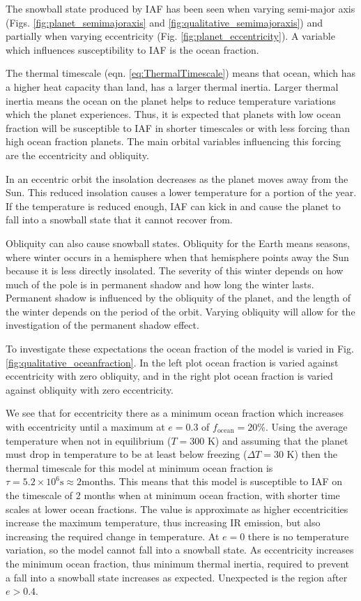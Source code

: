 \documentclass[12pt, onecolumn]{revtex4-2}    %
\begin{document}
The snowball state produced by IAF has been seen when varying semi-major axis (Figs. \ref{fig:planet_semimajoraxis} and \ref{fig:qualitative_semimajoraxis}) and partially when varying eccentricity (Fig. \ref{fig:planet_eccentricity}).
A variable which influences susceptibility to IAF is the ocean fraction.

The thermal timescale (eqn. \eqref{eq:ThermalTimescale}) means that ocean, which has a higher heat capacity than land, has a larger thermal inertia.
Larger thermal inertia means the ocean on the planet helps to reduce temperature variations which the planet experiences.
Thus, it is expected that planets with low ocean fraction will be susceptible to IAF in shorter timescales or with less forcing than high ocean fraction planets.
The main orbital variables influencing this forcing are the eccentricity and obliquity.

In an eccentric orbit the insolation decreases as the planet moves away from the Sun.
This reduced insolation causes a lower temperature for a portion of the year.
If the temperature is reduced enough, IAF can kick in and cause the planet to fall into a snowball state that it cannot recover from.

Obliquity can also cause snowball states.
Obliquity for the Earth means seasons, where winter occurs in a hemisphere when that hemisphere points away the Sun because it is less directly insolated.
The severity of this winter depends on how much of the pole is in permanent shadow and how long the winter lasts.
Permanent shadow is influenced by the obliquity of the planet, and the length of the winter depends on the period of the orbit.
Varying obliquity will allow for the investigation of the permanent shadow effect.

To investigate these expectations the ocean fraction of the model is varied in Fig. \ref{fig:qualitative_oceanfraction}.
In the left plot ocean fraction is varied against eccentricity with zero obliquity, and in the right plot ocean fraction is varied against obliquity with zero eccentricity.

We see that for eccentricity there as a minimum ocean fraction which increases with eccentricity until a maximum at $e=0.3$ of $f_\text{ocean} = 20\%$.
Using the average temperature when not in equilibrium ($T=300$ K) and assuming that the planet must drop in temperature to be at least below freezing ($\Delta T = 30$ K) then the thermal timescale for this model at minimum ocean fraction is $\tau = 5.2 \times 10^{6} \text{s} \approx 2 \text{months}$.
This means that this model is susceptible to IAF on the timescale of $2$ months when at minimum ocean fraction, with shorter time scales at lower ocean fractions.
The value is approximate as higher eccentricities increase the maximum temperature, thus increasing IR emission, but also increasing the required change in temperature.
At $e=0$ there is no temperature variation, so the model cannot fall into a snowball state.
As eccentricity increases the minimum ocean fraction, thus minimum thermal inertia, required to prevent a fall into a snowball state increases as expected.
Unexpected is the region after $e > 0.4$.
\end{document}
